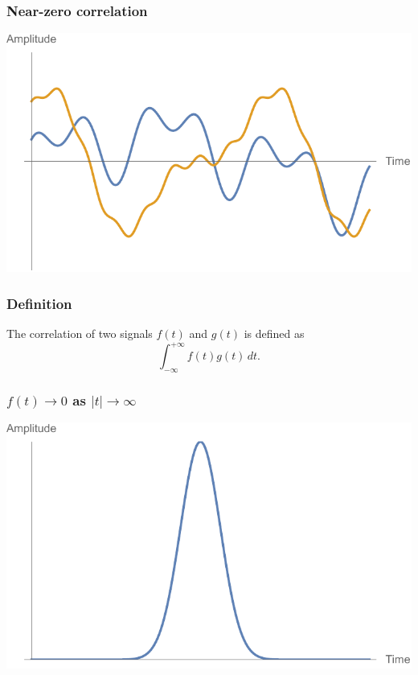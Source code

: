 \documentclass{beamer}
\begin{document}
\begin{frame}
    \frametitle{Near-zero correlation}

    \includegraphics[width=\textwidth]{3 zero.pdf}
\end{frame}

\begin{frame}
  \frametitle{Definition}

  The correlation of two signals $f(t)$ and $g(t)$ is defined as \[\int_{-\infty}^{+\infty} f(t) g(t) \,dt.\]
\end{frame}

\begin{frame}
  \frametitle{$f(t) \rightarrow 0$ as $|t| \rightarrow \infty$}

  \includegraphics[width=\textwidth]{4 square integrable.pdf}
\end{frame}
\end{document}
